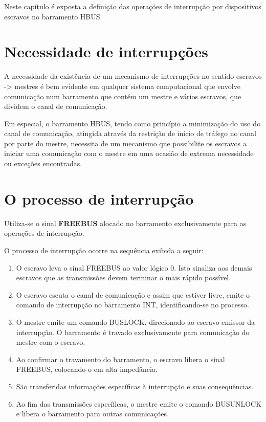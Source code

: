 \documentclass[11pt]{report}
\begin{document}
Neste capítulo é exposta a definição das operações de interrupção por dispositivos escravos no barramento HBUS.

\section{Necessidade de interrupções}

A necessidade da existência de um mecanismo de interrupções no sentido escravos -> mestres é bem evidente em qualquer sistema computacional que envolve comunicação num barramento que contém um mestre e vários escravos, que dividem o canal de comunicação.

Em especial, o barramento HBUS, tendo como princípio a minimização do uso do canal de comunicação, atingida através da restrição de início de tráfego no canal por parte do mestre, necessita de um mecanismo que possibilite os escravos a iniciar uma comunicação com o mestre em uma ocasião de extrema necessidade ou exceções encontradas.

\section{O processo de interrupção}

Utiliza-se o sinal \textbf{FREEBUS} alocado no barramento exclusivamente para as operações de interrupção.

O processo de interrupção ocorre na sequência exibida a seguir:

\begin{enumerate}

\item O escravo leva o sinal FREEBUS ao valor lógico 0. Isto sinaliza aos demais escravos que as transmissões devem terminar o mais rápido possível.

\item O escravo escuta o canal de comunicação e assim que estiver livre, emite o comando de interrupção no barramento INT, identificando-se no processo.

\item O mestre emite um comando BUSLOCK, direcionado ao escravo emissor da interrupção. O barramento é travado exclusivamente para comunicação do mestre com o escravo.

\item Ao confirmar o travamento do barramento, o escravo libera o sinal FREEBUS, colocando-o em alta impedância.

\item São transferidas informações específicas à interrupção e suas consequências.

\item Ao fim das transmissões específicas, o mestre emite o comando BUSUNLOCK e libera o barramento para outras comunicações.


\end{enumerate}
\end{document}

